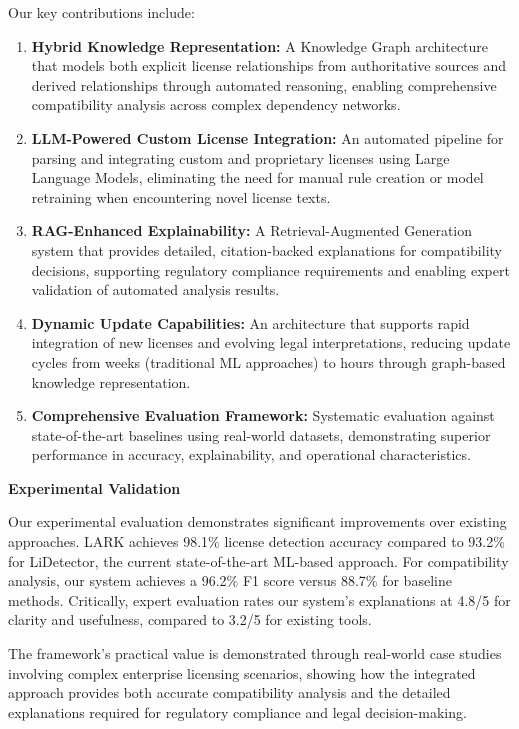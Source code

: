 Our key contributions include:

\begin{enumerate}
    \item \textbf{Hybrid Knowledge Representation:} A Knowledge Graph architecture that models both explicit license relationships from authoritative sources and derived relationships through automated reasoning, enabling comprehensive compatibility analysis across complex dependency networks.
    
    \item \textbf{LLM-Powered Custom License Integration:} An automated pipeline for parsing and integrating custom and proprietary licenses using Large Language Models, eliminating the need for manual rule creation or model retraining when encountering novel license texts.
    
    \item \textbf{RAG-Enhanced Explainability:} A Retrieval-Augmented Generation system that provides detailed, citation-backed explanations for compatibility decisions, supporting regulatory compliance requirements and enabling expert validation of automated analysis results.
    
    \item \textbf{Dynamic Update Capabilities:} An architecture that supports rapid integration of new licenses and evolving legal interpretations, reducing update cycles from weeks (traditional ML approaches) to hours through graph-based knowledge representation.
    
    \item \textbf{Comprehensive Evaluation Framework:} Systematic evaluation against state-of-the-art baselines using real-world datasets, demonstrating superior performance in accuracy, explainability, and operational characteristics.
\end{enumerate}

\textbf{Experimental Validation}

Our experimental evaluation demonstrates significant improvements over existing approaches. LARK achieves 98.1\% license detection accuracy compared to 93.2\% for LiDetector, the current state-of-the-art ML-based approach. For compatibility analysis, our system achieves a 96.2\% F1 score versus 88.7\% for baseline methods. Critically, expert evaluation rates our system's explanations at 4.8/5 for clarity and usefulness, compared to 3.2/5 for existing tools.

The framework's practical value is demonstrated through real-world case studies involving complex enterprise licensing scenarios, showing how the integrated approach provides both accurate compatibility analysis and the detailed explanations required for regulatory compliance and legal decision-making.

